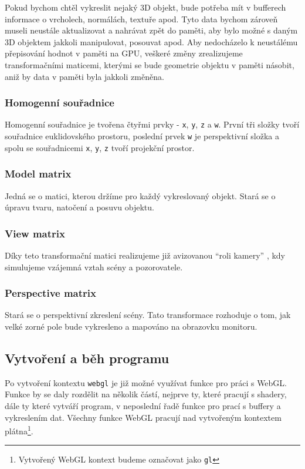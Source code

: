 Pokud bychom chtěl vykreslit nejaký 3D objekt, bude potřeba mít v bufferech informace o vrcholech, normálách, textuře apod. Tyto data bychom zároveň museli neustále aktualizovat a nahrávat zpět do paměti, aby bylo možné s daným 3D objektem jakkoli manipulovat, posouvat apod. Aby nedocházelo k neustálému přepisování hodnot v paměti na GPU, veškeré změny zrealizujeme transformačními maticemi, kterými se bude geometrie objektu v paměti násobit, aniž by data v paměti byla jakkoli změněna.

\subsubsection{Homogenní souřadnice}
Homogenní souřadnice je tvořena čtyřmi prvky - \texttt{x}, \texttt{y}, \texttt{z} a \texttt{w}. První tři složky tvoří souřadnice euklidovského prostoru, poslední prvek \texttt{w} je perspektivní složka a spolu se souřadnicemi \texttt{x}, \texttt{y}, \texttt{z} tvoří projekční prostor.


\subsubsection{Model matrix}
Jedná se o matici, kterou držíme pro každý vykreslovaný objekt. Stará se o úpravu tvaru, natočení a posuvu objektu.

\subsubsection{View matrix}
Díky teto transformační matici realizujeme již avizovanou ``roli kamery'' , kdy simulujeme vzájemná vztah scény a pozorovatele.

\subsubsection{Perspective matrix}
Stará se o perspektivní zkreslení scény. Tato transformace rozhoduje o tom, jak velké zorné pole bude vykresleno a mapováno 
na obrazovku monitoru. 

\newpage

\subsection{Vytvoření a běh programu}
Po vytvoření kontextu \texttt{webgl} je již možné využívat funkce pro práci s WebGL. Funkce by se daly rozdělit na několik částí, nejprve ty, které pracují s shadery, dále ty které vytváří program, v neposlední řadě funkce pro prací s buffery a vykreslením dat. Všechny funkce WebGL pracují nad vytvořeným kontextem plátna\footnote{Vytvořený WebGL kontext budeme označovat jako \texttt{gl}}.

